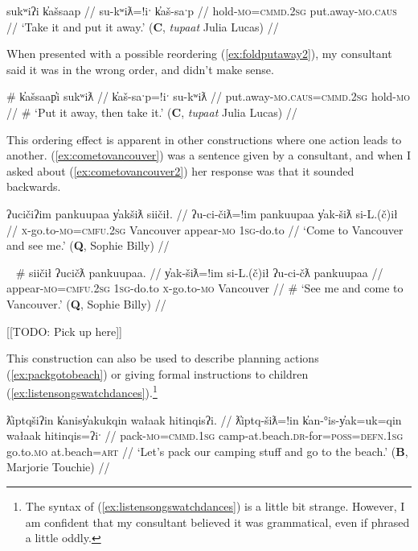 \ex \label{ex:foldputaway1}
\begingl
\glpreamble sukʷiʔi k̓ašsaap //
\gla su-kʷiƛ=!iˑ k̓aš-saˑp //
\glb hold-\textsc{mo}=\textsc{cmmd.2sg} put.away-\textsc{mo.caus} //
\glft `Take it and put it away.' (\textbf{C}, \textit{tupaat} Julia Lucas) //
\endgl
\xe

When presented with a possible reordering (\ref{ex:foldputaway2}), my consultant said it was in the wrong order, and didn't make sense.

\ex \label{ex:foldputaway2}
\begingl
\glpreamble \# k̓ašsaap̓i sukʷiƛ //
\gla k̓aš-saˑp=!iˑ su-kʷiƛ //
\glb put.away-\textsc{mo.caus}=\textsc{cmmd.2sg} hold-\textsc{mo} //
\glft \# `Put it away, then take it.' (\textbf{C}, \textit{tupaat} Julia Lucas) //
\endgl
\xe

This ordering effect is apparent in other constructions where one action leads to another. (\ref{ex:cometovancouver}) was a sentence given by a consultant, and when I asked about (\ref{ex:cometovancouver2}) her response was that it sounded backwards.

\ex \label{ex:cometovancouver}
\begingl
\glpreamble ʔucičiʔim pankuupaa y̓akšiƛ siičił. //
\gla ʔu-ci-čiƛ=!im pankuupaa y̓ak-šiƛ si-L.(č)ił //
\glb \textsc{x}-go.to-\textsc{mo}=\textsc{cmfu.2sg} Vancouver appear-\textsc{mo} \textsc{1sg}-do.to //
\glft `Come to Vancouver and see me.' (\textbf{Q}, Sophie Billy) //
\endgl
\xe

\ex~ \label{ex:cometovancouver2}
\begingl
\glpreamble \# siičił ʔucičƛ pankuupaa. //
\gla y̓ak-šiƛ=!im si-L.(č)ił ʔu-ci-čƛ pankuupaa //
\glb appear-\textsc{mo}=\textsc{cmfu.2sg} \textsc{1sg}-do.to \textsc{x}-go.to-\textsc{mo} Vancouver //
\glft \# `See me and come to Vancouver.' (\textbf{Q}, Sophie Billy) //
\endgl
\xe

[[TODO: Pick up here]]

This construction can also be used to describe planning actions (\ref{ex:packgotobeach}) or giving formal instructions to children (\ref{ex:listensongswatchdances}).\footnote{The syntax of (\ref{ex:listensongswatchdances}) is a little bit strange. However, I am confident that my consultant believed it was grammatical, even if phrased a little oddly.}

\ex \label{ex:packgotobeach}
\begingl
\glpreamble ƛ̓iptqšiʔin k̓anisy̓akukqin wałaak hitinqisʔi. //
\gla ƛ̓iptq-šiƛ=!in k̓an-°is-y̓ak=uk=qin wałaak hitinqis=ʔiˑ //
\glb pack-\textsc{mo}=\textsc{cmmd.1sg} camp-at.beach.\textsc{dr}-for=\textsc{poss}=\textsc{defn.1sg} go.to.\textsc{mo} at.beach=\textsc{art} //
\glft `Let's pack our camping stuff and go to the beach.' (\textbf{B}, Marjorie Touchie) //
\endgl
\xe

